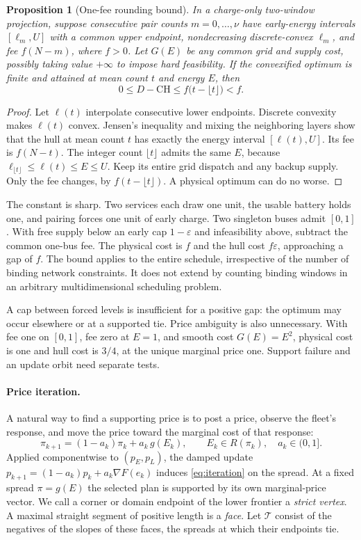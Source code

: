 \documentclass[11pt]{article}
\newtheorem{proposition}[theorem]{Proposition}
\theoremstyle{definition}\newtheorem{definition}[theorem]{Definition}
\theoremstyle{remark}\newtheorem{remark}[theorem]{Remark}
\newcommand{\CH}{\mathrm{CH}}
\begin{document}
\begin{proposition}[One-fee rounding bound]\label{prop:onefee}
In a charge-only two-window projection, suppose consecutive pair counts
$m=0,\ldots,\nu$ have early-energy intervals $[\ell_m,U]$ with a common
upper endpoint, nondecreasing discrete-convex $\ell_m$, and fee $f(N-m)$,
where $f>0$. Let $G(E)$ be any common grid and supply cost, possibly taking
value $+\infty$ to impose hard feasibility. If the convexified optimum is
finite and attained at mean count $t$ and energy $E$, then
\[
 0\le D-\CH\le f\bigl(t-\lfloor t\rfloor\bigr)<f.
\]
\end{proposition}
\begin{proof}
Let $\ell(t)$ interpolate consecutive lower endpoints. Discrete convexity
makes $\ell(t)$ convex. Jensen's inequality and mixing the neighboring
layers show that the hull at mean count $t$ has exactly the energy interval
$[\ell(t),U]$. Its fee is $f(N-t)$. The integer count $\lfloor t\rfloor$
admits the same $E$, because $\ell_{\lfloor t\rfloor}\le\ell(t)\le E\le U$.
Keep its entire grid dispatch and any backup supply. Only the fee changes,
by $f(t-\lfloor t\rfloor)$. A physical optimum can do no worse.
\end{proof}

The constant is sharp. Two services each draw one unit, the usable battery
holds one, and pairing forces one unit of early charge. Two singleton buses
admit $[0,1]$. With free supply below an early cap $1-\varepsilon$ and
infeasibility above, subtract the common one-bus fee. The physical cost is
$f$ and the hull cost $f\varepsilon$, approaching a gap of $f$.
The bound applies to the entire schedule, irrespective of the number of
binding network constraints. It does not extend by counting binding windows
in an arbitrary multidimensional scheduling problem.

A cap between forced levels is insufficient for a positive gap: the optimum
may occur elsewhere or at a supported tie. Price ambiguity is also
unnecessary. With fee one on $[0,1]$, fee zero at $E=1$, and smooth cost
$G(E)=E^2$, physical cost is one and hull cost is $3/4$, at the unique
marginal price one. Support failure and an update orbit need separate tests.

\paragraph{Price iteration.}
A natural way to find a supporting price is to post a price, observe the
fleet's response, and move the price toward the marginal cost of that response:
\begin{equation}\label{eq:iteration}
 \pi_{k+1}=(1-a_k)\pi_k+a_k\,g(E_k),\qquad E_k\in R(\pi_k),\quad a_k\in(0,1].
\end{equation}
Applied componentwise to $(p_E,p_L)$, the damped update
$p_{k+1}=(1-a_k)p_k+a_k\nabla F(e_k)$ induces \eqref{eq:iteration} on the
spread. At a fixed spread $\pi=g(E)$ the selected plan is supported by its own
marginal-price vector. We call a corner or domain endpoint of the lower
frontier a \emph{strict vertex}. A maximal straight segment of positive length
is a \emph{face}. Let $\mathcal T$ consist of the negatives of the slopes of
these faces, the spreads at which their endpoints tie.
\end{document}
